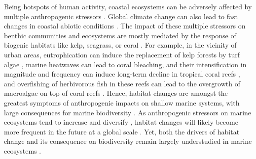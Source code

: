 \begin{refsection}
Being hotspots of human activity, coastal ecosystems can be adversely
affected by multiple anthropogenic stressors \autocites[
]{Bowler_2020}{Halpern_2019}. Global climate change can also lead to
fast changes in coastal abiotic conditions \autocites[
]{Burrows_2014}{Bowler_2020}. The impact of these multiple stressors on
benthic communities and ecosystems are mostly mediated by the response
of biogenic habitats like kelp, seagrass, or coral \autocites[
]{Harley_2006}{Rocha_2015b}. For example, in the vicinity of urban
areas, eutrophication can induce the replacement of kelp forests by turf
algae \autocites[ ]{Filbee-Dexter_2018}{Pessarrodona_2021}, marine
heatwaves can lead to coral bleaching, and their intensification in
magnitude and frequency can induce long-term decline in tropical coral
reefs \autocite{Bellwood_2004}, and overfishing of herbivorous fish in
these reefs can lead to the overgrowth of macroalgae on top of coral
reefs \autocite{Hughes_2007}. Hence, habitat changes are amongst the
greatest symptoms of anthropogenic impacts on shallow marine systems,
with large consequences for marine biodiversity \autocite{Rocha_2015a}.
As anthropogenic stressors on marine ecosystems tend to increase and
diversify \autocite{Halpern_2019}, habitat changes will likely become
more frequent in the future at a global scale \autocite{Conversi_2015}.
Yet, both the drivers of habitat change and its consequence on
biodiversity remain largely understudied in marine ecosystems
\autocite{Mazor_2018}.


\end{refsection}
